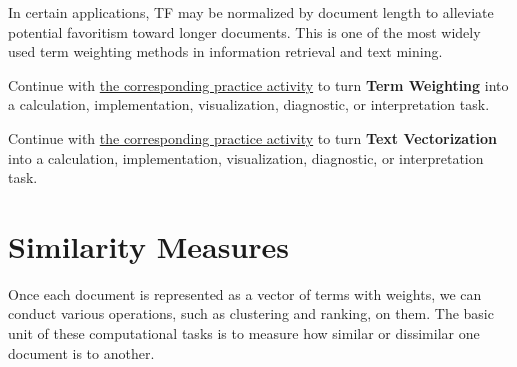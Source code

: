 \documentclass[
  letterpaper,
]{scrbook}
\begin{document}
In certain applications, TF may be normalized by document length to
alleviate potential favoritism toward longer documents. This is one of
the most widely used term weighting methods in information retrieval and
text mining.

\begin{tcolorbox}[enhanced jigsaw, arc=.35mm, bottomrule=.15mm, bottomtitle=1mm, breakable, colback=white, colbacktitle=quarto-callout-tip-color!10!white, colframe=quarto-callout-tip-color-frame, coltitle=black, left=2mm, leftrule=.75mm, opacityback=0, opacitybacktitle=0.6, rightrule=.15mm, title=\textcolor{quarto-callout-tip-color}{\faLightbulb}\hspace{0.5em}{Put it into practice}, titlerule=0mm, toprule=.15mm, toptitle=1mm]

Continue with \hyperref[sec-pr-11-term-weighting]{the corresponding
practice activity} to turn \textbf{Term Weighting} into a calculation,
implementation, visualization, diagnostic, or interpretation task.

\end{tcolorbox}

\begin{tcolorbox}[enhanced jigsaw, arc=.35mm, bottomrule=.15mm, bottomtitle=1mm, breakable, colback=white, colbacktitle=quarto-callout-tip-color!10!white, colframe=quarto-callout-tip-color-frame, coltitle=black, left=2mm, leftrule=.75mm, opacityback=0, opacitybacktitle=0.6, rightrule=.15mm, title=\textcolor{quarto-callout-tip-color}{\faLightbulb}\hspace{0.5em}{Put it into practice}, titlerule=0mm, toprule=.15mm, toptitle=1mm]

Continue with \hyperref[sec-pr-11-text-vectorization]{the corresponding
practice activity} to turn \textbf{Text Vectorization} into a
calculation, implementation, visualization, diagnostic, or
interpretation task.

\end{tcolorbox}

\section{Similarity Measures}\label{fig-text-sim}

Once each document is represented as a vector of terms with weights, we
can conduct various operations, such as clustering and ranking, on them.
The basic unit of these computational tasks is to measure how similar or
dissimilar one document is to another.
\end{document}
